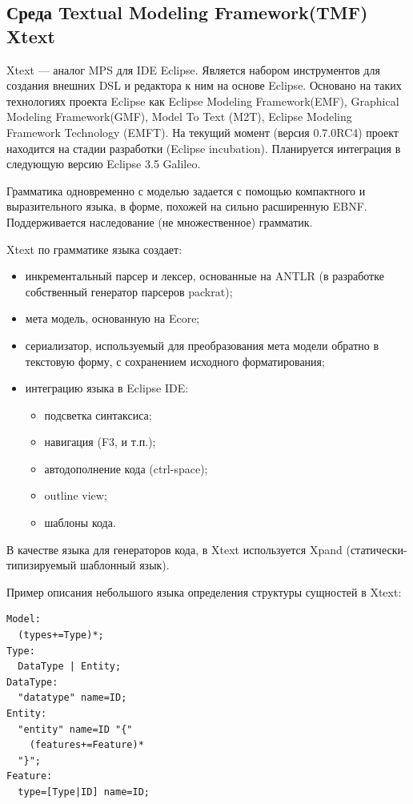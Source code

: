 \documentclass[a4paper,12pt,titlepage]{extarticle}
\begin{document}
\subsection{Среда Textual Modeling Framework(TMF) Xtext}
Xtext --- аналог MPS для IDE Eclipse. Является набором инструментов для
создания внешних DSL и редактора к ним на основе Eclipse. Основано на
таких технологиях проекта Eclipse как Eclipse Modeling Framework(EMF),
Graphical Modeling Framework(GMF), Model To Text (M2T), Eclipse Modeling
Framework Technology (EMFT). На текущий момент (версия 0.7.0RC4) проект
находится на стадии разработки (Eclipse incubation). Планируется интеграция в следующую
версию Eclipse 3.5 Galileo.

Грамматика одновременно с моделью задается с помощью компактного и
выразительного языка, в форме, похожей на сильно расширенную EBNF.
Поддерживается наследование (не множественное) грамматик.

Xtext по грамматике языка создает:
\begin{itemize}
  \item инкрементальный парсер и лексер, основанные на ANTLR (в разработке
  собственный генератор парсеров packrat);
  \item мета модель, основанную на Ecore;
  \item сериализатор, используемый для преобразования мета модели обратно в
  текстовую форму, с сохранением исходного форматирования; 
  \item интеграцию языка в Eclipse IDE:
  \begin{itemize}
    \item подсветка синтаксиса;
    \item навигация (F3, и т.п.);
    \item автодополнение кода (ctrl-space);
    \item outline view;
    \item шаблоны кода.
  \end{itemize}
\end{itemize}

В качестве языка для генераторов кода, в Xtext используется Xpand
(статически-типизируемый шаблонный язык).

Пример описания небольшого языка определения структуры сущностей в Xtext:
\begin{verbatim}
Model:
  (types+=Type)*;
Type:
  DataType | Entity;
DataType:
  "datatype" name=ID;
Entity:
  "entity" name=ID "{"
    (features+=Feature)* 
  "}";
Feature:
  type=[Type|ID] name=ID;   
\end{verbatim}
\end{document}
